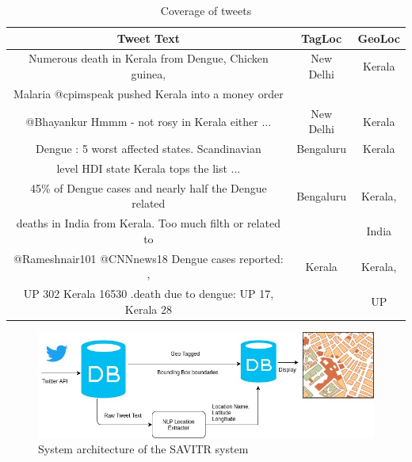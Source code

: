 
\begin{table}[!hbt]
	\begin{center}
		\caption{Coverage of tweets}
		\label{tab:Kerala}
		\begin{tabular}{|c|c|c|}
			\hline
		{\footnotesize Tweet Text}&{\footnotesize TagLoc}& {\footnotesize GeoLoc} \\\hline
			{\footnotesize Numerous death in Kerala from Dengue,  Chicken guinea,}&{\footnotesize New Delhi}& {\footnotesize Kerala}\\
		{\footnotesize Malaria @cpimspeak pushed Kerala into a money order } & &\\\hline
			{\footnotesize @Bhayankur Hmmm - not rosy in Kerala either ...} & {\footnotesize New Delhi}& {\footnotesize Kerala}\\\hline
{\footnotesize Dengue : 5 worst affected states. Scandinavian } &{\footnotesize Bengaluru}& {\footnotesize Kerala}\\
			{\footnotesize level HDI state Kerala tops the list ... }& & \\\hline
			
			{\footnotesize 45\% of Dengue cases and nearly half the Dengue related }&{\footnotesize Bengaluru}&{\footnotesize Kerala,}\\
			{\footnotesize deaths in India from Kerala. Too much filth or related to}&& {\footnotesize India} \\\hline
			{\footnotesize @Rameshnair101 @CNNnews18 Dengue cases reported: },&{\footnotesize Kerala}&{\footnotesize Kerala,}\\
			 {\footnotesize UP 302 Kerala 16530 .death due to dengue: UP 17, Kerala 28}& &{\footnotesize UP} \\		
			\hline
			
			\hline
		\end{tabular}
	\end{center}
\end{table}

\fi


\begin{figure}[tb]
	\centering
		\includegraphics[scale=0.3]{system_arch}
		\caption{System architecture of the SAVITR system}
		\label{fig:system_arch}
\end{figure}

